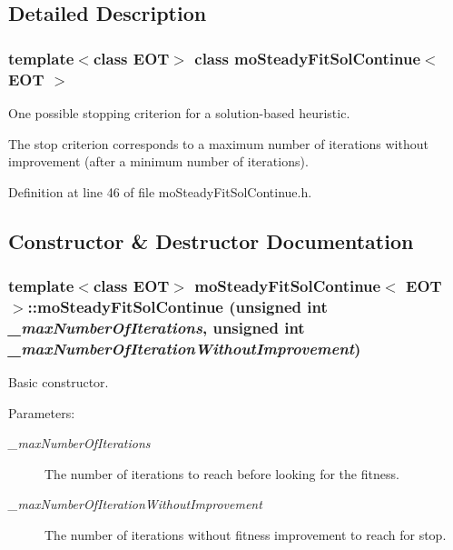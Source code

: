 \subsection{Detailed Description}
\subsubsection*{template$<$class EOT$>$ class mo\-Steady\-Fit\-Sol\-Continue$<$ EOT $>$}

One possible stopping criterion for a solution-based heuristic. 

The stop criterion corresponds to a maximum number of iterations without improvement (after a minimum number of iterations). 



Definition at line 46 of file mo\-Steady\-Fit\-Sol\-Continue.h.

\subsection{Constructor \& Destructor Documentation}
\subsubsection{\setlength{\rightskip}{0pt plus 5cm}template$<$class EOT$>$ {\bf mo\-Steady\-Fit\-Sol\-Continue}$<$ EOT $>$::{\bf mo\-Steady\-Fit\-Sol\-Continue} (unsigned int {\em \_\-max\-Number\-Of\-Iterations}, unsigned int {\em \_\-max\-Number\-Of\-Iteration\-Without\-Improvement})\hspace{0.3cm}{\tt  [inline]}}\label{classmo_steady_fit_sol_continue_a0}


Basic constructor. 

\begin{Desc}
\item[Parameters:]
\begin{description}
\item[{\em \_\-max\-Number\-Of\-Iterations}]The number of iterations to reach before looking for the fitness. \item[{\em \_\-max\-Number\-Of\-Iteration\-Without\-Improvement}]The number of iterations without fitness improvement to reach for stop. \end{description}
\end{Desc}


